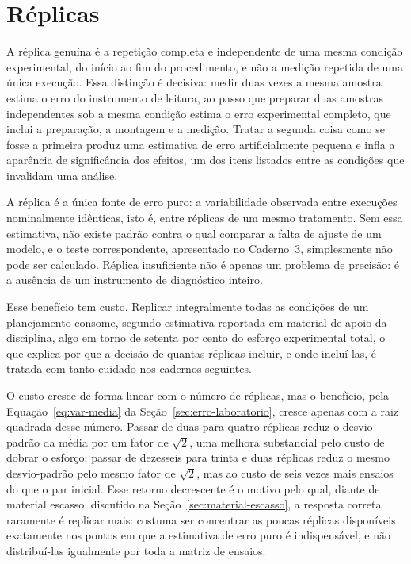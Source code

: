 \documentclass{doeapostila}
\begin{document}
\section{Réplicas}
\label{sec:replicas}

A réplica genuína é a repetição completa e independente de uma mesma
condição experimental, do início ao fim do procedimento, e não a medição
repetida de uma única execução. Essa distinção é decisiva: medir duas vezes
a mesma amostra estima o erro do instrumento de leitura, ao passo que
preparar duas amostras independentes sob a mesma condição estima o erro
experimental completo, que inclui a preparação, a montagem e a medição.
Tratar a segunda coisa como se fosse a primeira produz uma estimativa de
erro artificialmente pequena e infla a aparência de significância dos
efeitos, um dos itens listados entre as condições que invalidam uma
análise.

A réplica é a única fonte de erro puro: a variabilidade observada entre
execuções nominalmente idênticas, isto é, entre réplicas de um mesmo
tratamento. Sem essa estimativa, não existe padrão contra o qual comparar a
falta de ajuste de um modelo, e o teste correspondente, apresentado no
Caderno~3, simplesmente não pode ser calculado. Réplica insuficiente não é
apenas um problema de precisão: é a ausência de um instrumento de
diagnóstico inteiro.

Esse benefício tem custo. Replicar integralmente todas as condições de um
planejamento consome, segundo estimativa reportada em material de apoio da
disciplina, algo em torno de setenta por cento do esforço experimental
total, o que explica por que a decisão de quantas réplicas incluir, e onde
incluí-las, é tratada com tanto cuidado nos cadernos seguintes.

O custo cresce de forma linear com o número de réplicas, mas o benefício,
pela Equação~\eqref{eq:var-media} da Seção~\ref{sec:erro-laboratorio}, cresce
apenas com a raiz quadrada desse número. Passar de duas para quatro réplicas
reduz o desvio-padrão da média por um fator de $\sqrt{2}$, uma melhora
substancial pelo custo de dobrar o esforço; passar de dezesseis para trinta
e duas réplicas reduz o mesmo desvio-padrão pelo mesmo fator de $\sqrt{2}$,
mas ao custo de seis vezes mais ensaios do que o par inicial. Esse retorno
decrescente é o motivo pelo qual, diante de material escasso, discutido na
Seção~\ref{sec:material-escasso}, a resposta correta raramente é replicar
mais: costuma ser concentrar as poucas réplicas disponíveis exatamente nos
pontos em que a estimativa de erro puro é indispensável, e não distribuí-las
igualmente por toda a matriz de ensaios.
\end{document}
